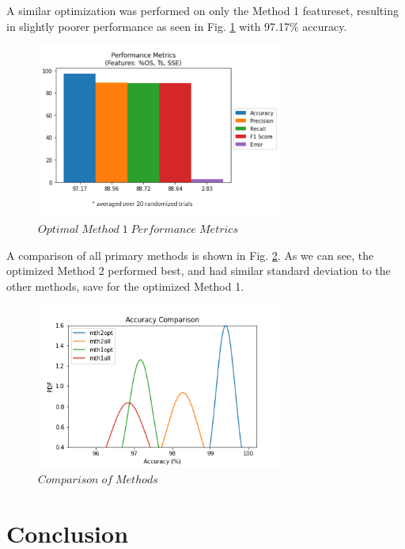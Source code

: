\documentclass[conference]{IEEEtran}
\begin{document}
A similar optimization was performed on only the Method 1 featureset, resulting in slightly poorer performance as seen in Fig. \ref{fig:M1opt} with 97.17\% accuracy.

\begin{figure}[htb]
\centering
\includegraphics[width=3.2in]{figures/101_m1optperf.png}
\caption{$Optimal\;Method\;1\;Performance\;Metrics$}
\label{fig:M1opt}
\end{figure}

A comparison of all primary methods is shown in Fig. \ref{fig:final}. As we can see, the optimized Method 2 performed best, and had similar standard deviation to the other methods, save for the optimized Method 1.

\begin{figure}[htb]
\centering
\includegraphics[width=3.2in]{figures/102_mth_comp.png}
\caption{$Comparison\;of\;Methods$}
\label{fig:final}
\end{figure}

\section{Conclusion}
\label{sec:concl}
\end{document}
